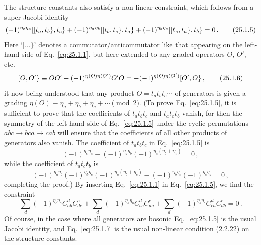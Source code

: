 The structure constants also satisfy a non-linear constraint, which follows
from a super-Jacobi identity
\begin{equation}
  (-1)^{\eta_c\eta_a}
    \mathopen{[}\mathopen{[}t_a,t_b\mathclose{\}},t_c\mathclose{\}}
  +(-1)^{\eta_a\eta_b}
    \mathopen{[}\mathopen{[}t_b,t_c\mathclose{\}},t_a\mathclose{\}}
  +(-1)^{\eta_b\eta_c}
    \mathopen{[}\mathopen{[}t_c,t_a\mathclose{\}},t_b\mathclose{\}}
  =0\,.
  \tag{25.1.5}\label{eq:25.1.5}
\end{equation}
Here `$[\ldots\}$' denotes a commutator/anticommutator like that appearing on
the left-hand side of Eq.~\eqref{eq:25.1.1}, but here extended to any graded
operators $O$, $O'$, etc.
\begin{equation}
  \mathopen{[}O,O'\mathclose{\}}
  \equiv OO'-(-1)^{\eta(O)\eta(O')}O'O
  =-(-1)^{\eta(O)\eta(O')}\mathopen{[}O',O\mathclose{\}}\,,
  \tag{25.1.6}\label{eq:25.1.6}
\end{equation}
it now being understood that any product $O=t_at_bt_c\cdots$ of generators is
given a grading
$\eta(O)\equiv\eta_a+\eta_b+\eta_c+\cdots\pmod 2$. (To prove
Eq.~\eqref{eq:25.1.5}, it is sufficient to prove that the coefficients of
$t_at_bt_c$ and $t_at_ct_b$ vanish, for then the symmetry of the left-hand
side of Eq.~\eqref{eq:25.1.5} under the cyclic permutations
$abc\longrightarrow bca\longrightarrow cab$ will ensure that the coefficients
of all other products of generators also vanish. The coefficient of
$t_at_bt_c$ in Eq.~\eqref{eq:25.1.5} is
\[
  (-1)^{\eta_c\eta_a}
  -(-1)^{\eta_a\eta_b}(-1)^{\eta_a(\eta_b+\eta_c)}
  =0\,,
\]
while the coefficient of $t_at_ct_b$ is
\[
  (-1)^{\eta_a\eta_b}(-1)^{\eta_b\eta_c}
    (-1)^{\eta_a(\eta_b+\eta_c)}
  -(-1)^{\eta_b\eta_c}(-1)^{\eta_c\eta_a}
  =0\,,
\]
completing the proof.) By inserting Eq.~\eqref{eq:25.1.1} in
Eq.~\eqref{eq:25.1.5}, we find the constraint
\begin{equation}
  \sum_d(-1)^{\eta_c\eta_a}C^d_{ab}C^e_{dc}
  +\sum_d(-1)^{\eta_a\eta_b}C^d_{bc}C^e_{da}
  +\sum_d(-1)^{\eta_b\eta_c}C^d_{ca}C^e_{db}
  =0\,.
  \tag{25.1.7}\label{eq:25.1.7}
\end{equation}
Of course, in the case where all generators are bosonic
Eq.~\eqref{eq:25.1.5} is the usual Jacobi identity, and
Eq.~\eqref{eq:25.1.7} is the usual non-linear condition (2.2.22) on the
structure constants.

